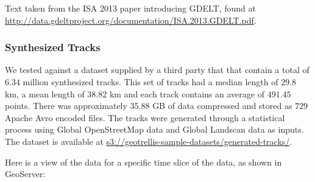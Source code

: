 Text taken from the ISA 2013 paper introducing GDELT, found at \url{http://data.gdeltproject.org/documentation/ISA.2013.GDELT.pdf}.


\subsubsection{Synthesized Tracks}
\label{sec:performance:datasets:synthesized}

We tested against a dataset supplied by a third party that that contain a total of $6.34$ million synthesized tracks.
This set of tracks had a median length of $29.8$ km, a mean length of $38.82$ km and each track contains an average of $491.45$ points.
There was approximately $35.88$ GB of data compressed and stored as $729$ Apache Avro encoded files.
The tracks were generated through a statistical process using Global OpenStreetMap data and Global Landscan data as inputs.
The dataset is available at \url{s3://geotrellis-sample-datasets/generated-tracks/}.

Here is a view of the data for a specific time slice of the data, as shown in GeoServer:
